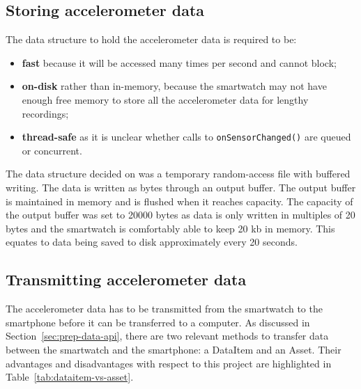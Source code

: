     \subsection{Storing accelerometer data}
      \label{sec:storing-accelerometer-data}
      The data structure to hold the accelerometer data is required to be:
      \begin{itemize}
        \item \textbf{fast} because it will be accessed many times per second and cannot block;
        \item \textbf{on-disk} rather than in-memory, because the smartwatch may not have enough free memory to store all the accelerometer data for lengthy recordings;
        \item \textbf{thread-safe} as it is unclear whether calls to \texttt{onSensorChanged()} are queued or concurrent.
      \end{itemize}
      
      The data structure decided on was a temporary random-access file with buffered writing. The data is written as bytes through an output buffer. The output buffer is maintained in memory and is flushed when it reaches capacity. The capacity of the output buffer was set to 20000 bytes as data is only written in multiples of 20 bytes and the smartwatch is comfortably able to keep 20 kb in memory. This equates to data being saved to disk approximately every 20 seconds.
      
    \subsection{Transmitting accelerometer data}
      The accelerometer data has to be transmitted from the smartwatch to the smartphone before it can be transferred to a computer. As discussed in Section~\ref{sec:prep-data-api}, there are two relevant methods to transfer data between the smartwatch and the smartphone: a DataItem and an Asset. Their advantages and disadvantages with respect to this project are highlighted in Table~\ref{tab:dataitem-vs-asset}.
      
